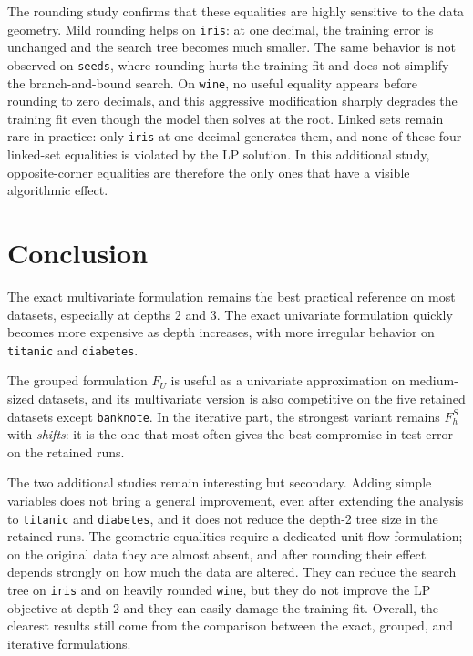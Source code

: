 \documentclass[11pt,a4paper]{article}
\begin{document}
The rounding study confirms that these equalities are highly sensitive to the data geometry. Mild rounding helps on \texttt{iris}: at one decimal, the training error is unchanged and the search tree becomes much smaller. The same behavior is not observed on \texttt{seeds}, where rounding hurts the training fit and does not simplify the branch-and-bound search. On \texttt{wine}, no useful equality appears before rounding to zero decimals, and this aggressive modification sharply degrades the training fit even though the model then solves at the root. Linked sets remain rare in practice: only \texttt{iris} at one decimal generates them, and none of these four linked-set equalities is violated by the LP solution. In this additional study, opposite-corner equalities are therefore the only ones that have a visible algorithmic effect.

\section{Conclusion}

The exact multivariate formulation remains the best practical reference on most datasets, especially at depths 2 and 3. The exact univariate formulation quickly becomes more expensive as depth increases, with more irregular behavior on \texttt{titanic} and \texttt{diabetes}.

The grouped formulation $F_U$ is useful as a univariate approximation on medium-sized datasets, and its multivariate version is also competitive on the five retained datasets except \texttt{banknote}. In the iterative part, the strongest variant remains $F_h^S$ with \emph{shifts}: it is the one that most often gives the best compromise in test error on the retained runs.

The two additional studies remain interesting but secondary. Adding simple variables does not bring a general improvement, even after extending the analysis to \texttt{titanic} and \texttt{diabetes}, and it does not reduce the depth-2 tree size in the retained runs. The geometric equalities require a dedicated unit-flow formulation; on the original data they are almost absent, and after rounding their effect depends strongly on how much the data are altered. They can reduce the search tree on \texttt{iris} and on heavily rounded \texttt{wine}, but they do not improve the LP objective at depth 2 and they can easily damage the training fit. Overall, the clearest results still come from the comparison between the exact, grouped, and iterative formulations.
\end{document}
